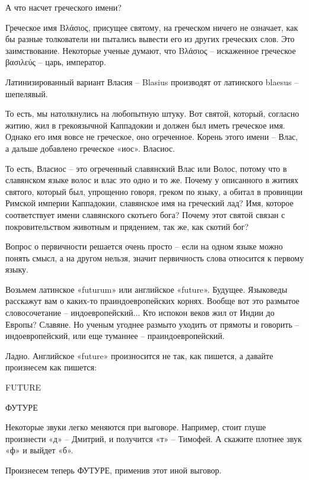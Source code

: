    А что насчет греческого имени?

   Греческое имя Βλάσιος, присущее святому, на греческом ничего не означает, как бы разные толкователи ни пытались вывести его из других греческих слов. Это заимствование. Некоторые ученые думают, что Βλάσιος – искаженное греческое βασιλεύς – царь, император.

 Латинизированный вариант Власия –  Blasius производят от латинского blaesus – шепелявый.

   То есть, мы натолкнулись на любопытную штуку. Вот святой, который, согласно житию, жил в грекоязычной Каппадокии и должен был иметь греческое имя. Однако его имя вовсе не греческое, оно огреченное. Корень этого имени – Влас, а дальше добавлено греческое «иос». Власиос.

   То есть, Власиос – это огреченный славянский Влас или Волос, потому что в славянском языке волос и влас это одно и то же. Почему у описанного в житиях святого, который был, упрощенно говоря, греком по языку, а обитал в провинции Римской империи Каппадокии, славянское имя на греческий лад? Имя, которое соответствует имени славянского скотьего бога? Почему этот святой связан с покровительством животным и прядением, так же, как скотий бог?

   Вопрос о первичности решается очень просто – если на одном языке можно понять смысл, а на другом нельзя, значит первичность слова относится к первому языку.

   Возьмем латинское «futurum» или английское «future». Будущее. Языковеды расскажут вам о каких-то праиндоевропейских корнях. Вообще вот это размытое словосочетание – индоевропейский... Кто испокон веков жил от Индии до Европы? Славяне. Но ученым угоднее  размыто уходить от прямоты и говорить – индоевропейский, или еще туманнее – праиндоевропейский.

   Ладно. Английское «future» произносится не так, как пишется, а давайте произнесем как пишется:\newline

FUTURE\newline

ФУТУРЕ\newline

   Некоторые звуки легко меняются при выговоре. Например, стоит глуше произнести «д» – Дмитрий, и получится «т» – Тимофей. А скажите плотнее звук «ф» и выйдет «б».

Произнесем теперь ФУТУРЕ, применив этот иной выговор.\newline

